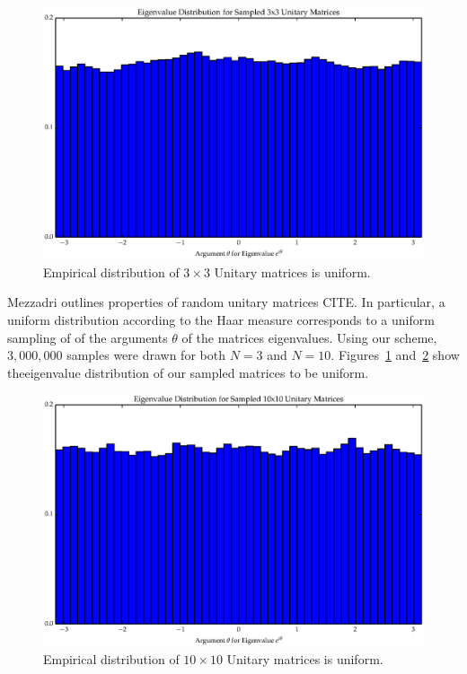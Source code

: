 \begin{figure}[ht]
\centering
  \includegraphics[scale=0.6, angle=0]{images/unitary_3_hist.eps}
\caption{Empirical distribution of $3\times 3$ Unitary matrices is uniform.}
\label{fig:Uny3}
\end{figure}
Mezzadri outlines properties of random unitary matrices CITE. In particular, a uniform distribution according to the Haar measure corresponds to a uniform sampling of of the arguments $\theta$ of the matrices eigenvalues. Using our scheme, $3,000,000$ samples were drawn for both $N = 3$ and $N = 10$. Figures~\ref{fig:Uny3} and~\ref{fig:Uny10} show theeigenvalue distribution of our sampled matrices to be uniform.  
\begin{figure}[ht]
\centering
  \includegraphics[scale=0.6, angle=0]{images/unitary_10_hist.eps}
\caption{Empirical distribution of $10\times 10$ Unitary matrices is uniform.}
\label{fig:Uny10}
\end{figure}

